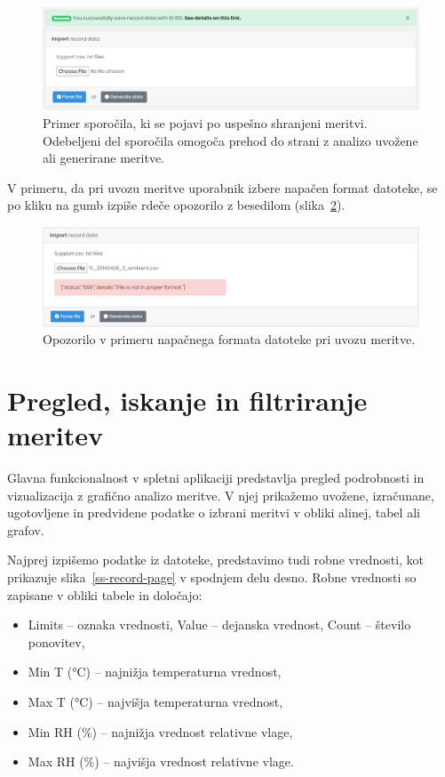 \documentclass[a4paper, 12pt]{book}
\begin{document}
\begin{figure}[h]
\begin{center}
\includegraphics[width=\textwidth]{slike/import_success.png}
\end{center}
\caption{Primer sporočila, ki se pojavi po uspešno shranjeni meritvi. Odebeljeni del sporočila omogoča prehod do strani z analizo uvožene ali generirane meritve.}
\label{ss-import-success}
\end{figure}

V primeru, da pri uvozu meritve uporabnik izbere napačen format datoteke, se po kliku na gumb  izpiše rdeče opozorilo z besedilom  (slika~\ref{ss-import-error}).

\begin{figure}[h]
\begin{center}
\includegraphics[width=\textwidth]{slike/import_error.png}
\end{center}
\caption{Opozorilo v primeru napačnega formata datoteke pri uvozu meritve.}
\label{ss-import-error}
\end{figure}


\section{Pregled, iskanje in filtriranje meritev}

Glavna funkcionalnost v spletni aplikaciji predstavlja pregled podrobnosti in vizualizacija z grafično analizo meritve. V njej prikažemo uvožene, izračunane, ugotovljene in predvidene podatke o izbrani meritvi v obliki alinej, tabel ali grafov. 

Najprej izpišemo podatke iz datoteke, predstavimo tudi robne vrednosti, kot prikazuje slika~\ref{ss-record-page} v spodnjem delu desno.
Robne vrednosti so zapisane v obliki tabele in določajo:
\begin{itemize}
	\item Limits – oznaka vrednosti, Value – dejanska vrednost, Count – število ponovitev,
	\item Min T (°C) – najnižja temperaturna vrednost,
	\item Max T (°C) – najvišja temperaturna vrednost,
	\item Min RH (\%) – najnižja vrednost relativne vlage,
	\item Max RH (\%) – najvišja vrednost relativne vlage.
\end{itemize}
\end{document}
